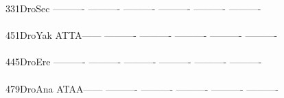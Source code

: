 \documentclass[11pt,twoside,reqno,a4paper]{article}
\begin{document}
{331\hspace*{2\charwidth}DroSec	----------	----------	----------	----------	----------	----------	\\
\hspace*{5\charwidth}\hspace*{7\charwidth}\hspace*{1\charwidth}\hspace*{1\charwidth}\hspace*{1\charwidth}\hspace*{1\charwidth}\hspace*{1\charwidth}\hspace*{1\charwidth}\\
451\hspace*{2\charwidth}DroYak	ATTA------	----------	----------	----------	----------	----------	\\
\hspace*{5\charwidth}\hspace*{7\charwidth}\hspace*{1\charwidth}\hspace*{1\charwidth}\hspace*{1\charwidth}\hspace*{1\charwidth}\hspace*{1\charwidth}\hspace*{1\charwidth}\\
445\hspace*{2\charwidth}DroEre	----------	----------	----------	----------	----------	----------	\\
\hspace*{5\charwidth}\hspace*{7\charwidth}\hspace*{1\charwidth}\hspace*{1\charwidth}\hspace*{1\charwidth}\hspace*{1\charwidth}\hspace*{1\charwidth}\hspace*{1\charwidth}\\
479\hspace*{2\charwidth}DroAna	ATAA------	----------	----------	----------	----------	----------	\\
\hspace*{5\charwidth}\hspace*{7\charwidth}\hspace*{1\charwidth}\hspace*{1\charwidth}\hspace*{1\charwidth}\hspace*{1\charwidth}\hspace*{1\charwidth}\hspace*{1\charwidth}\\
}
\end{document}
